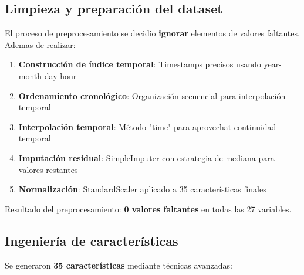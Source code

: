 \subsection{Limpieza y preparación del dataset}
El proceso de preprocesamiento se decidio \textbf{ignorar} elementos de valores
faltantes. Ademas de realizar:

\begin{enumerate}
    \item \textbf{Construcción de índice temporal}: Timestamps precisos usando year-month-day-hour
    \item \textbf{Ordenamiento cronológico}: Organización secuencial para interpolación temporal
    \item \textbf{Interpolación temporal}: Método "time" para aprovechat continuidad temporal
    \item \textbf{Imputación residual}: SimpleImputer con estrategia de mediana para valores restantes
    \item \textbf{Normalización}: StandardScaler aplicado a 35 características finales
\end{enumerate}

Resultado del preprocesamiento: \textbf{0 valores faltantes} en todas las 27 variables.

\subsection{Ingeniería de características}
Se generaron \textbf{35 características} mediante técnicas avanzadas:

